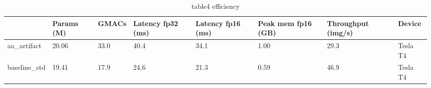 \begin{table}
\caption{table4 efficiency}
\label{tab:table4_efficiency}
\begin{tabular}{llllllll}
\toprule
 & Params (M) & GMACs & Latency fp32 (ms) & Latency fp16 (ms) & Peak mem fp16 (GB) & Throughput (img/s) & Device \\
\midrule
aa\_artifact & 20.06 & 33.0 & 40.4 & 34.1 & 1.00 & 29.3 & Tesla T4 \\
baseline\_std & 19.41 & 17.9 & 24.6 & 21.3 & 0.59 & 46.9 & Tesla T4 \\
\bottomrule
\end{tabular}
\end{table}
